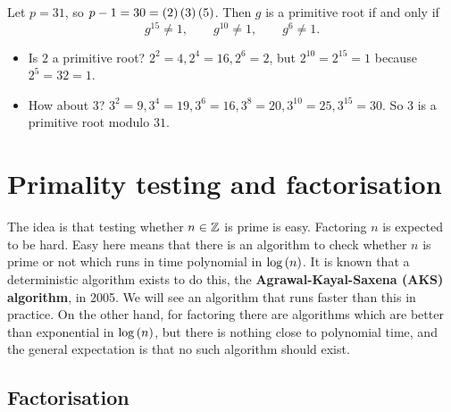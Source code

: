 \begin{example*}
Let $ p = 31 $, so $ p - 1 = 30 = \br{2}\br{3}\br{5} $. Then $ g $ is a primitive root if and only if
$$ g^{15} \ne 1, \qquad g^{10} \ne 1, \qquad g^{6} \ne 1. $$
\begin{itemize}
\item Is $ 2 $ a primitive root? $ 2^2 = 4, 2^4 = 16, 2^6 = 2 $, but $ 2^{10} = 2^{15} = 1 $ because $ 2^5 = 32 = 1 $.
\item How about $ 3 $? $ 3^2 = 9, 3^4 = 19, 3^6 = 16, 3^8 = 20, 3^{10} = 25, 3^{15} = 30 $. So $ 3 $ is a primitive root modulo $ 31 $.
\end{itemize}
\end{example*}

\pagebreak

\section{Primality testing and factorisation}

The idea is that testing whether $ n \in \mathbb{Z} $ is prime is easy. Factoring $ n $ is expected to be hard. Easy here means that there is an algorithm to check whether $ n $ is prime or not which runs in time polynomial in $ \log\br{n} $. It is known that a deterministic algorithm exists to do this, the \textbf{Agrawal-Kayal-Saxena (AKS) algorithm}, in 2005. We will see an algorithm that runs faster than this in practice. On the other hand, for factoring there are algorithms which are better than exponential in $ \log\br{n} $, but there is nothing close to polynomial time, and the general expectation is that no such algorithm should exist.

\subsection{Factorisation}


